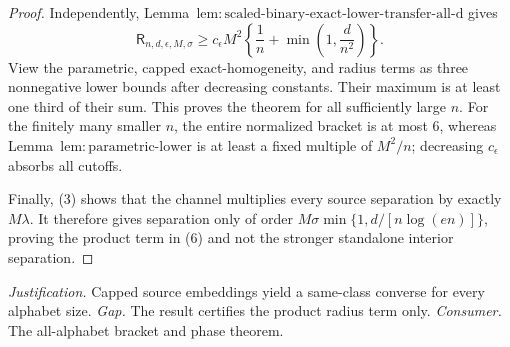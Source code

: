 \documentclass{article}
\begin{document}
\begin{proof}
Independently, Lemma~\(\mathrm{lem:scaled\text{-}binary\text{-}exact\text{-}lower\text{-}transfer\text{-}all\text{-}d}\) gives
\[
 \mathsf R_{n,d,\epsilon,M,\sigma}
 \ge c_{\epsilon}M^2\left\{\frac1n+\min\left(1,\frac d{n^2}\right)\right\}.
\tag{7}
\]
View the parametric, capped exact-homogeneity, and radius terms as three nonnegative lower bounds after decreasing constants.  Their maximum is at least one third of their sum.  This proves the theorem for all sufficiently large \(n\).  For the finitely many smaller \(n\), the entire normalized bracket is at most \(6\), whereas Lemma~\(\mathrm{lem:parametric\text{-}lower}\) is at least a fixed multiple of \(M^2/n\); decreasing \(c_{\epsilon}\) absorbs all cutoffs.

Finally, (3) shows that the channel multiplies every source separation by exactly \(M\lambda\).  It therefore gives separation only of order \(M\sigma\min\{1,d/[n\log(en)]\}\), proving the product term in (6) and not the stronger standalone interior separation.
\end{proof}
\par\smallskip\noindent \textit{Justification.} Capped source embeddings yield a same-class converse for every alphabet size. \textit{Gap.} The result certifies the product radius term only. \textit{Consumer.} The all-alphabet bracket and phase theorem.
\end{document}
